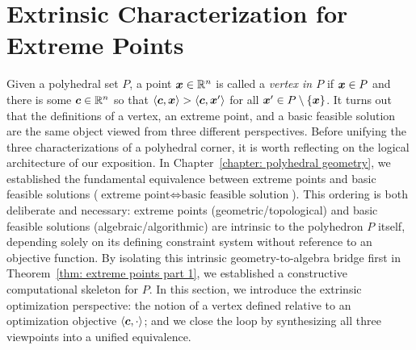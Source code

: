

\section{Extrinsic Characterization for Extreme Points}

Given a polyhedral set $P$, a point ${\boldsymbol x}\in \mathbb R^{n}$ is called a {\em vertex in $P$} if ${\boldsymbol x}\in P$ and there is some ${\boldsymbol c}\in\mathbb R^{n}$ so that $\left\langle{\boldsymbol c}, {\boldsymbol x}\right\rangle > \left\langle{\boldsymbol c}, {\boldsymbol x}'\right\rangle$ for all ${\boldsymbol x}'\in P\setminus\{{\boldsymbol x}\}$. It turns out that the definitions of a vertex, an extreme point, and a basic feasible solution are the same object viewed from three different perspectives. Before unifying the three characterizations of a polyhedral corner, it is worth reflecting on the logical architecture of our exposition. In Chapter~\ref{chapter: polyhedral geometry}, we established the fundamental equivalence between extreme points and basic feasible solutions ($\text{extreme point} \iff \text{basic feasible solution}$). This ordering is both deliberate and necessary: extreme points (geometric/topological) and basic feasible solutions (algebraic/algorithmic) are intrinsic to the polyhedron $P$ itself, depending solely on its defining constraint system without reference to an objective function. By isolating this intrinsic geometry-to-algebra bridge first in Theorem~\ref{thm: extreme points part 1}, we established a constructive computational skeleton for $P$. In this section, we introduce the extrinsic optimization perspective: the notion of a vertex defined relative to an optimization objective $\left\langle{\boldsymbol c}, \cdot\right\rangle$; and we close the loop by synthesizing all three viewpoints into a unified equivalence. 


